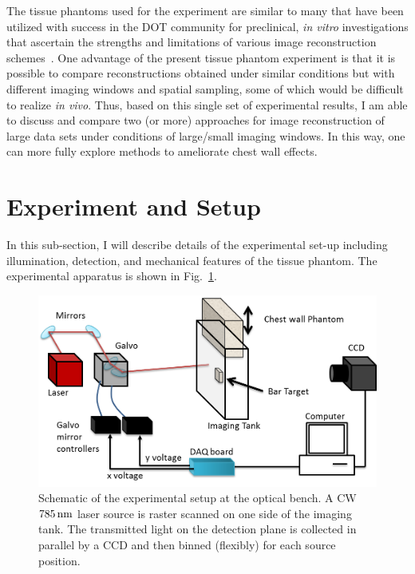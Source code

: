 The tissue phantoms used for the experiment are similar to many that have been utilized with success in the DOT community for preclinical, {\em in vitro} investigations that ascertain the strengths and limitations of various image reconstruction schemes~\cite{Culver2003,Pogue2006,Cerussi2012}. One advantage of the present tissue phantom experiment is that it is possible to compare reconstructions obtained under similar conditions but with different imaging windows and spatial sampling, some of which would be difficult to realize {\em in vivo}. Thus, based on this single set of experimental results, I am able to discuss and compare two (or more) approaches for image reconstruction of large data sets under conditions of large/small imaging windows. In this way, one can more fully explore methods to ameliorate chest wall effects.
\clearpage
\section{Experiment and Setup}
\label{sec:3_exp}
In this sub-section, I will describe details of the experimental set-up including illumination, detection, and mechanical features of the tissue phantom. The experimental apparatus is shown in  Fig.~\ref{fig:chestwallschem}.
\begin{figure}[h]
\centering\includegraphics[width=14cm]{./figures/3_Chestwall/chestwallschem.png}
\caption[Schematic of the chest wall experiment]{Schematic of the experimental setup at the optical bench. A CW $785\,{\rm nm}$ laser source is raster scanned on one side of the imaging tank. The transmitted light on the detection plane is collected in parallel by a CCD and then binned (flexibly) for each source position.}
\label{fig:chestwallschem}
\end{figure}
